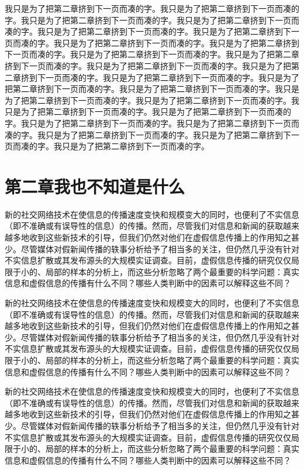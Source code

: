 \documentclass[a4paper,AutoFakeBold,oneside,12pt]{book}
\begin{document}
我只是为了把第二章挤到下一页而凑的字。我只是为了把第二章挤到下一页而凑的字。我只是为了把第二章挤到下一页而凑的字。我只是为了把第二章挤到下一页而凑的字。我只是为了把第二章挤到下一页而凑的字。我只是为了把第二章挤到下一页而凑的字。我只是为了把第二章挤到下一页而凑的字。我只是为了把第二章挤到下一页而凑的字。我只是为了把第二章挤到下一页而凑的字。我只是为了把第二章挤到下一页而凑的字。我只是为了把第二章挤到下一页而凑的字。我只是为了把第二章挤到下一页而凑的字。我只是为了把第二章挤到下一页而凑的字。我只是为了把第二章挤到下一页而凑的字。我只是为了把第二章挤到下一页而凑的字。我只是为了把第二章挤到下一页而凑的字。我只是为了把第二章挤到下一页而凑的字。我只是为了把第二章挤到下一页而凑的字。我只是为了把第二章挤到下一页而凑的字。我只是为了把第二章挤到下一页而凑的字。我只是为了把第二章挤到下一页而凑的字。我只是为了把第二章挤到下一页而凑的字。我只是为了把第二章挤到下一页而凑的字。我只是为了把第二章挤到下一页而凑的字。

\chapter*{第二章\quad{}我也不知道是什么}
\newtranschapter

新的社交网络技术在使信息的传播速度变快和规模变大的同时，也便利了不实信息（即不准确或有误导性的信息）的传播。然而，尽管我们对信息和新闻的获取越来越多地收到这些新技术的引导，但我们仍然对他们在虚假信息传播上的作用知之甚少。尽管媒体对假新闻传播的轶事分析给予了相当多的关注，但仍然几乎没有针对不实信息扩散或其发布源头的大规模实证调查。目前，虚假信息传播的研究仅仅局限于小的、局部的样本的分析上，而这些分析忽略了两个最重要的科学问题：真实信息和虚假信息的传播有什么不同？哪些人类判断中的因素可以解释这些不同？

新的社交网络技术在使信息的传播速度变快和规模变大的同时，也便利了不实信息（即不准确或有误导性的信息）的传播。然而，尽管我们对信息和新闻的获取越来越多地收到这些新技术的引导，但我们仍然对他们在虚假信息传播上的作用知之甚少。尽管媒体对假新闻传播的轶事分析给予了相当多的关注，但仍然几乎没有针对不实信息扩散或其发布源头的大规模实证调查。目前，虚假信息传播的研究仅仅局限于小的、局部的样本的分析上，而这些分析忽略了两个最重要的科学问题：真实信息和虚假信息的传播有什么不同？哪些人类判断中的因素可以解释这些不同？

新的社交网络技术在使信息的传播速度变快和规模变大的同时，也便利了不实信息（即不准确或有误导性的信息）的传播。然而，尽管我们对信息和新闻的获取越来越多地收到这些新技术的引导，但我们仍然对他们在虚假信息传播上的作用知之甚少。尽管媒体对假新闻传播的轶事分析给予了相当多的关注，但仍然几乎没有针对不实信息扩散或其发布源头的大规模实证调查。目前，虚假信息传播的研究仅仅局限于小的、局部的样本的分析上，而这些分析忽略了两个最重要的科学问题：真实信息和虚假信息的传播有什么不同？哪些人类判断中的因素可以解释这些不同？
\end{document}
